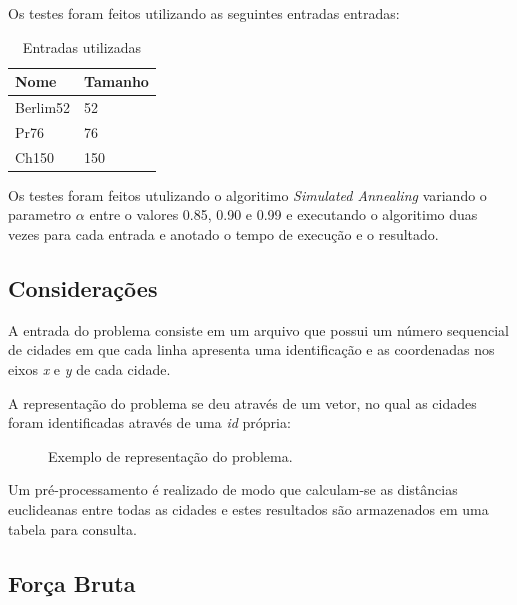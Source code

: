 \documentclass[a4paper, 12pt]{article}
\begin{document}
Os testes foram feitos utilizando as seguintes entradas entradas:

\begin{table}[h]

\label{tab:input}
\centering
\begin{tabular}{| l |  l |}
 \hline
 \textbf{Nome} & \textbf{Tamanho}\\
 \hline
 Berlim52 & 52 \\
 \hline
 Pr76 & 76\\
 \hline
 Ch150 & 150\\
 \hline
\end{tabular}
\caption{Entradas utilizadas}
\end{table}

Os testes foram feitos utulizando o algoritimo \textit{Simulated Annealing} variando o parametro $\alpha$
entre o valores 0.85, 0.90 e 0.99 e executando o algoritimo duas vezes para cada entrada e anotado o tempo de execução e o resultado.


\subsection{Considerações}

A entrada do problema consiste em um arquivo que possui um número sequencial de cidades em que cada linha apresenta uma identificação e as coordenadas nos eixos \textit{x} e \textit{y} de cada cidade.

A representação do problema se deu através de um vetor, no qual as cidades foram identificadas através de uma \textit{id} própria: 

\begin{figure}[!ht]
	\centering
	\caption{Exemplo de representação do problema.}
	\label{fig:arr}
\end{figure}

Um pré-processamento é realizado de modo que calculam-se as distâncias euclideanas entre todas as cidades e estes resultados são armazenados em uma tabela para consulta.

\subsection{Força Bruta}
\end{document}
